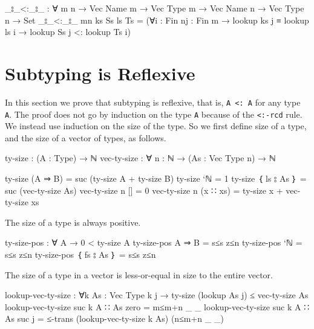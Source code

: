 \begin{fence}
\begin{code}
_⦂_<:_⦂_ : ∀ {m n} → Vec Name m → Vec Type m → Vec Name n → Vec Type n → Set
_⦂_<:_⦂_ {m}{n} ks Ss ls Ts = (∀{i : Fin n}{j : Fin m}
    → lookup ks j ≡ lookup ls i  →  lookup Ss j <: lookup Ts i)
\end{code}
\end{fence}

\hypertarget{subtyping-is-reflexive}{%
\section{Subtyping is Reflexive}\label{subtyping-is-reflexive}}

In this section we prove that subtyping is reflexive, that is,
\texttt{A\ \textless{}:\ A} for any type \texttt{A}. The proof does not
go by induction on the type \texttt{A} because of the
\texttt{\textless{}:-rcd} rule. We instead use induction on the size of
the type. So we first define size of a type, and the size of a vector of
types, as follows.

\begin{fence}
\begin{code}
ty-size : (A : Type) → ℕ
vec-ty-size : ∀ {n : ℕ} → (As : Vec Type n) → ℕ

ty-size (A ⇒ B) = suc (ty-size A + ty-size B)
ty-size `ℕ = 1
ty-size ｛ ls ⦂ As ｝ = suc (vec-ty-size As)
vec-ty-size {n} [] = 0
vec-ty-size {n} (x ∷ xs) = ty-size x + vec-ty-size xs
\end{code}
\end{fence}

The size of a type is always positive.

\begin{fence}
\begin{code}
ty-size-pos : ∀ {A} → 0 < ty-size A
ty-size-pos {A ⇒ B} = s≤s z≤n
ty-size-pos {`ℕ} = s≤s z≤n
ty-size-pos {｛ fs ⦂ As ｝ } = s≤s z≤n
\end{code}
\end{fence}

The size of a type in a vector is less-or-equal in size to the entire
vector.

\begin{fence}
\begin{code}
lookup-vec-ty-size : ∀{k} {As : Vec Type k} {j}
   → ty-size (lookup As j) ≤ vec-ty-size As
lookup-vec-ty-size {suc k} {A ∷ As} {zero} = m≤m+n _ _
lookup-vec-ty-size {suc k} {A ∷ As} {suc j} = ≤-trans (lookup-vec-ty-size {k} {As}) (n≤m+n _ _)
\end{code}
\end{fence}

